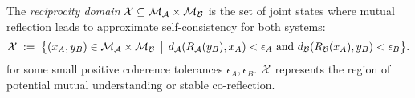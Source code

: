 \begin{definition}
\label{definition:bk7_reciprocity_domain}
The \emph{reciprocity domain} \(\mathcal{X} \subseteq \mathcal{M}_{\mathcal{A}}\times\mathcal{M}_{\mathcal{B}}\) is the set of joint states where mutual reflection leads to approximate self-consistency for both systems:
\[
\mathcal{X}\;:=\;\bigl\{(x_A, y_B) \in \mathcal{M}_{\mathcal{A}}\times\mathcal{M}_{\mathcal{B}} \,\bigm|\, d_{\mathcal{A}}(R_{\mathcal{A}}(y_B), x_A) < \epsilon_A \text{ and } d_{\mathcal{B}}(R_{\mathcal{B}}(x_A), y_B) < \epsilon_B \bigr\}.
\]
for some small positive coherence tolerances \(\epsilon_A, \epsilon_B\). \(\mathcal{X}\) represents the region of potential mutual understanding or stable co-reflection.
\end{definition}
